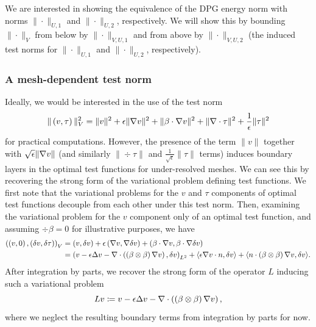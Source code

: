 We are interested in showing the equivalence of the DPG energy norm with norms $\|\cdot\|_{U,1}$ and $\|\cdot\|_{U,2}$, respectively.  We will show this by bounding $\|\cdot \|_V$ from below by $\|\cdot\|_{V,U,1}$ and from above by $\|\cdot\|_{V,U,2}$ (the induced test norms for $\|\cdot\|_{U,1}$ and $\|\cdot\|_{U,2}$, respectively).  


\subsubsection{A mesh-dependent test norm}
Ideally, we would be interested in the use of the test norm 
\[
\|\left(v,\tau\right)\|_{V}^2 = \|v\|^2 + \epsilon \|\grad v\|^2 + \|\beta \cdot \grad v\|^2 + \| \div \tau\|^2 + \frac{1}{\epsilon}\|\tau\|^2
\]
for practical computations. However, the presence of the term $\|v\|$ together with $\sqrt{\epsilon}\|\grad v\|$ (and similarly $\|\div \tau\|$ and $\frac{1}{\sqrt{\epsilon}}\|\tau\|$ terms) induces boundary layers in the optimal test functions for under-resolved meshes. We can see this by recovering the strong form of the variational problem defining test functions. We first note that the variational problems for the $v$ and $\tau$ components of optimal test functions decouple from each other under this test norm. Then, examining the variational problem for the $v$ component only of an optimal test function, and assuming $\div \beta = 0$ for illustrative purposes, we have 
\begin{align*}
\left(\left(v,0\right),\left(\delta v,\delta\tau\right)\right)_{V} &= (v,\delta v) + \epsilon \left(\grad v,\grad \delta v\right) + \left(\beta \cdot \grad v, \beta \cdot \grad \delta v\right)\\
&= \left(v - \epsilon \Delta v - \div \left(\left(\beta \otimes \beta\right) \grad v\right), \delta v\right)_{L^2} + \langle \epsilon \grad v\cdot n, \delta v\rangle + \langle n\cdot \left(\beta\otimes\beta\right) \grad v , \delta v\rangle.
\end{align*}
After integration by parts, we recover the strong form of the operator $L$ inducing such a variational problem 
\[
Lv \coloneqq v - \epsilon \Delta v - \div \left(\left(\beta \otimes \beta\right) \grad v\right),
\]
where we neglect the resulting boundary terms from integration by parts for now. 


